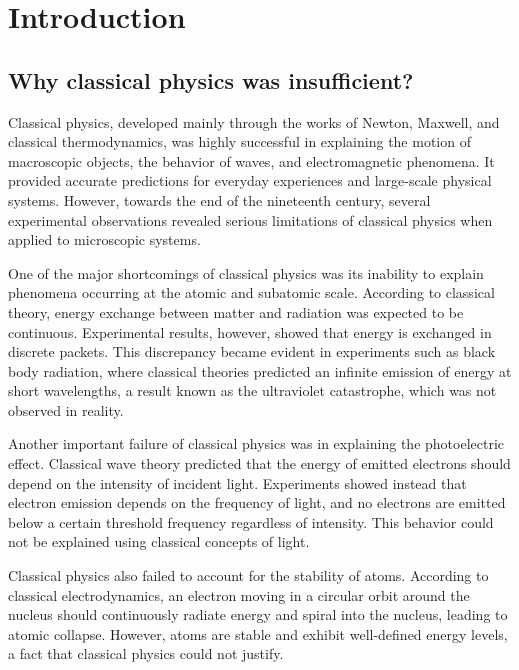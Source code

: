 \documentclass[14pt,a4paper]{extarticle}
\begin{document}
\vspace*{\fill}

\newpage
\tableofcontents
\newpage
\pagestyle{plain}
\section{Introduction}
\subsection{Why classical physics was insufficient?}

Classical physics, developed mainly through the works of Newton, Maxwell, and classical thermodynamics, was highly successful in explaining the motion of macroscopic objects, the behavior of waves, and electromagnetic phenomena. It provided accurate predictions for everyday experiences and large-scale physical systems. However, towards the end of the nineteenth century, several experimental observations revealed serious limitations of classical physics when applied to microscopic systems.

One of the major shortcomings of classical physics was its inability to explain phenomena occurring at the atomic and subatomic scale. According to classical theory, energy exchange between matter and radiation was expected to be continuous. Experimental results, however, showed that energy is exchanged in discrete packets. This discrepancy became evident in experiments such as black body radiation, where classical theories predicted an infinite emission of energy at short wavelengths, a result known as the ultraviolet catastrophe, which was not observed in reality.

Another important failure of classical physics was in explaining the photoelectric effect. Classical wave theory predicted that the energy of emitted electrons should depend on the intensity of incident light. Experiments showed instead that electron emission depends on the frequency of light, and no electrons are emitted below a certain threshold frequency regardless of intensity. This behavior could not be explained using classical concepts of light.

Classical physics also failed to account for the stability of atoms. According to classical electrodynamics, an electron moving in a circular orbit around the nucleus should continuously radiate energy and spiral into the nucleus, leading to atomic collapse. However, atoms are stable and exhibit well-defined energy levels, a fact that classical physics could not justify.
\end{document}
